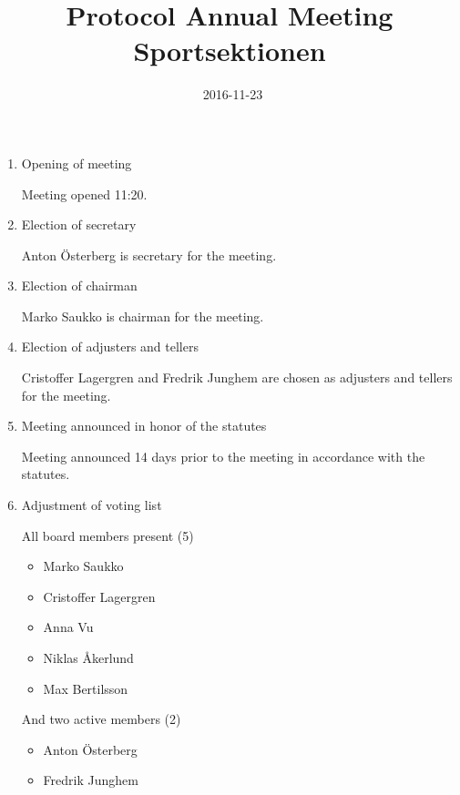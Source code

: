 \documentclass[12pt,a4paper]{article}
\begin{document}
	\title{\Huge Protocol Annual Meeting Sportsektionen}
	\date{\ 2016-11-23}
	\maketitle

	\null
	\vfill

	\clearpage

	\begin{enumerate}

		\item Opening of meeting
		
			Meeting opened 11:20.
			
		\item Election of secretary
		
			Anton Österberg is secretary for the meeting.
			
		\item Election of chairman
		
			Marko Saukko is chairman for the meeting.
			
		\item Election of adjusters and tellers
		
			Cristoffer Lagergren and Fredrik Junghem are chosen as adjusters and tellers for the meeting.
			
		\item Meeting announced in honor of the statutes
		
			Meeting announced 14 days prior to the meeting in accordance with the statutes.
			
		\item Adjustment of voting list
		
			All board members present (5)
			\begin{itemize}
				\item Marko Saukko
				\item Cristoffer Lagergren
				\item Anna Vu
				\item Niklas Åkerlund
				\item Max Bertilsson
			\end{itemize}
				
			And two active members (2)
			\begin{itemize}
				\item Anton Österberg
				\item Fredrik Junghem
			\end{itemize}
				

\end{enumerate}
\end{document}

